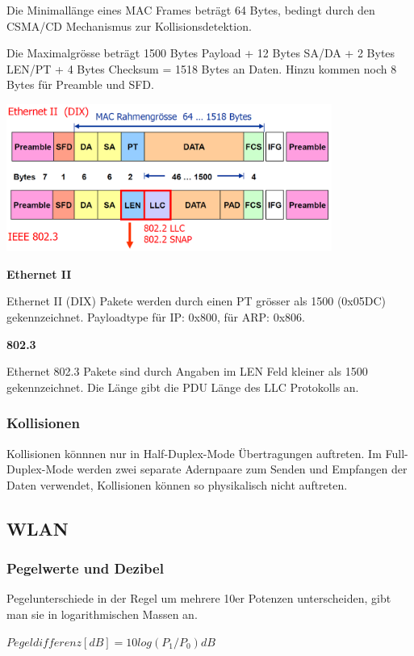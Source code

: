 Die Minimallänge eines MAC Frames beträgt 64 Bytes, bedingt durch den CSMA/CD
Mechanismus zur Kollisionsdetektion.

Die Maximalgrösse beträgt 1500 Bytes Payload + 12 Bytes SA/DA + 2 Bytes LEN/PT +
4 Bytes Checksum = 1518 Bytes an Daten. Hinzu kommen noch 8 Bytes für Preamble
und SFD.

\begin{center}
	\includegraphics[width=0.8\textwidth]{media/MACFrame.png}
\end{center}

\textbf{Ethernet II}

Ethernet II (DIX) Pakete werden durch einen PT grösser als 1500
(0x05DC) gekennzeichnet. Payloadtype für IP: 0x800, für ARP: 0x806.

\textbf{802.3}

Ethernet 802.3 Pakete sind durch Angaben im LEN Feld kleiner als 1500
gekennzeichnet. Die Länge gibt die PDU Länge des LLC Protokolls an.


\subsubsection{Kollisionen}

Kollisionen könnnen nur in Half-Duplex-Mode Übertragungen auftreten. Im
Full-Duplex-Mode werden zwei separate Adernpaare zum Senden und Empfangen der
Daten verwendet, Kollisionen können so physikalisch nicht auftreten.


\subsection{WLAN}

\subsubsection{Pegelwerte und Dezibel}
Pegelunterschiede in der Regel um mehrere 10er Potenzen unterscheiden, gibt man sie in logarithmischen Massen an.

$Pegeldifferenz [dB] = 10log(P_1/P_0) dB$

